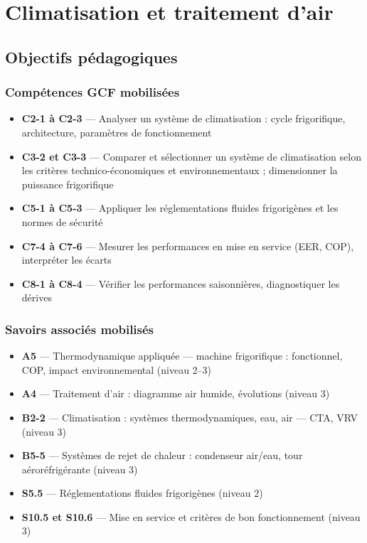\chapter{Climatisation et traitement d'air}

\section{Objectifs pédagogiques}

\subsection*{Compétences GCF mobilisées}
\begin{itemize}
  \item \textbf{C2-1 à C2-3} — Analyser un système de climatisation : cycle frigorifique, architecture, paramètres de fonctionnement
  \item \textbf{C3-2 et C3-3} — Comparer et sélectionner un système de climatisation selon les critères technico-économiques et environnementaux ; dimensionner la puissance frigorifique
  \item \textbf{C5-1 à C5-3} — Appliquer les réglementations fluides frigorigènes et les normes de sécurité
  \item \textbf{C7-4 à C7-6} — Mesurer les performances en mise en service (EER, COP), interpréter les écarts
  \item \textbf{C8-1 à C8-4} — Vérifier les performances saisonnières, diagnostiquer les dérives
\end{itemize}

\subsection*{Savoirs associés mobilisés}
\begin{itemize}
  \item \textbf{A5} — Thermodynamique appliquée — machine frigorifique : fonctionnel, COP, impact environnemental (niveau 2–3)
  \item \textbf{A4} — Traitement d'air : diagramme air humide, évolutions (niveau 3)
  \item \textbf{B2-2} — Climatisation : systèmes thermodynamiques, eau, air — CTA, VRV (niveau 3)
  \item \textbf{B5-5} — Systèmes de rejet de chaleur : condenseur air/eau, tour aéroréfrigérante (niveau 3)
  \item \textbf{S5.5} — Réglementations fluides frigorigènes (niveau 2)
  \item \textbf{S10.5 et S10.6} — Mise en service et critères de bon fonctionnement (niveau 3)
\end{itemize}

